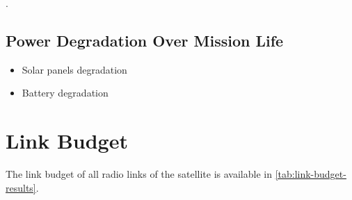 .

\subsection{Power Degradation Over Mission Life}

\begin{itemize}
    \item Solar panels degradation
    \item Battery degradation
\end{itemize}

\section{Link Budget}

The link budget of all radio links of the satellite is available in \autoref{tab:link-budget-results}.

